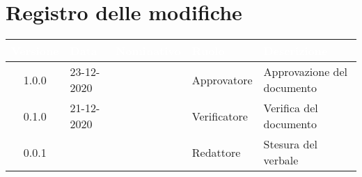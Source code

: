 \section*{Registro delle modifiche}
{
\renewcommand{\arraystretch}{1.5}
\centering
\begin{longtable}{c C{2.6cm}  C{2.6cm} C{2.6cm} C{3.5cm}}
\textcolor{white}{\textbf{Versione}}&
\textcolor{white}{\textbf{Data}}&
\textcolor{white}{\textbf{Nominativo}}&
\textcolor{white}{\textbf{Ruolo}}&
\textcolor{white}{\textbf{Descrizione}}\\	
\endhead
		
1.0.0 & 23-12-2020 & \SG{} & Approvatore & Approvazione del documento\\
0.1.0 & 21-12-2020 & \RA{} & Verificatore & Verifica del documento\\		
0.0.1 & \Data{} & \SP{} & Redattore & Stesura del verbale\\
		
\end{longtable}
}
